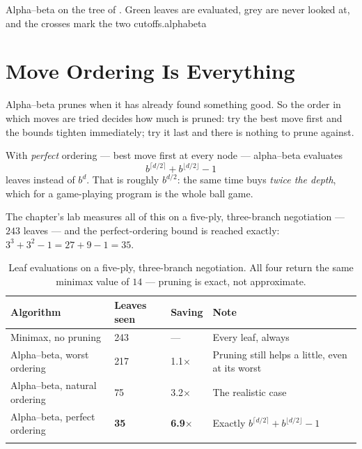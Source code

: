 {}%
{Alpha--beta on the tree of . Green leaves are evaluated, grey are
never looked at, and the crosses mark the two cutoffs.}{alphabeta}

\section{Move Ordering Is Everything}

Alpha--beta prunes when it has already found something good. So the order in which
moves are tried decides how much is pruned: try the best move first and the bounds
tighten immediately; try it last and there is nothing to prune against.

With \emph{perfect} ordering --- best move first at every node --- alpha--beta
evaluates
\[
  b^{\lceil d/2 \rceil} + b^{\lfloor d/2 \rfloor} - 1
\]
leaves instead of $b^{d}$. That is roughly $b^{d/2}$: the same time buys
\emph{twice the depth}, which for a game-playing program is the whole ball game.

The chapter's lab measures all of this on a five-ply, three-branch negotiation ---
$243$ leaves --- and the perfect-ordering bound is reached exactly:
$3^{3} + 3^{2} - 1 = 27 + 9 - 1 = 35$.

\smallskip
\noindent\begin{longtable}{@{}L{5.6cm}L{2.4cm}L{2.0cm}L{4.6cm}@{}}
\toprule
{}
\textbf{Algorithm} & \textbf{Leaves seen} & \textbf{Saving} & \textbf{Note} \\
\midrule
\endhead
Minimax, no pruning & 243 & --- & Every leaf, always \\
Alpha--beta, worst ordering & 217 & 1.1$\times$ & Pruning still helps a little,
even at its worst \\
Alpha--beta, natural ordering & 75 & 3.2$\times$ & The realistic case \\
Alpha--beta, perfect ordering & \textbf{35} & \textbf{6.9$\times$} & Exactly
$b^{\lceil d/2\rceil} + b^{\lfloor d/2\rfloor} - 1$ \\
\bottomrule
\caption{Leaf evaluations on a five-ply, three-branch negotiation. All four return
the same minimax value of $14$ --- pruning is exact, not approximate.}
\label{tab:alphabeta}
\end{longtable}

